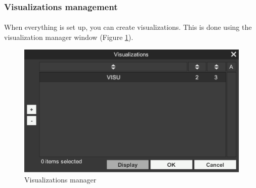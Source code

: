 \documentclass[a4paper]{article}
\begin{document}
\subsubsection{Visualizations management}
\paragraph{} When everything is set up, you can create visualizations. This is done using the visualization manager window (Figure \ref{visuGestionUI}).
\begin{figure}[H]
\begin{center}
\includegraphics[scale=0.5]{VisualizationGestion.png}
\end{center}
\caption{\label{visuGestionUI}Visualizations manager}
\end{figure}
\end{document}

